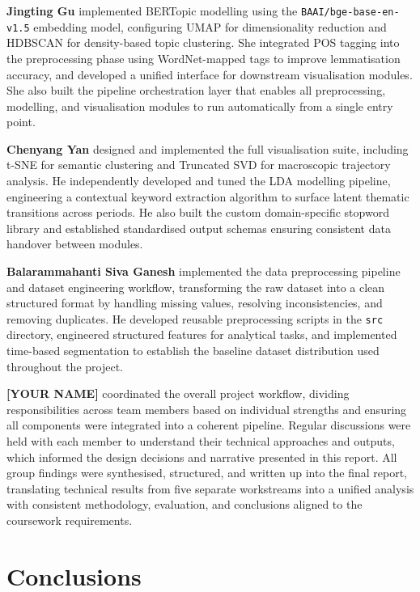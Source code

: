 \documentclass{article}
\begin{document}
\textbf{Jingting Gu} implemented BERTopic modelling using
the \texttt{BAAI/bge-base-en-v1.5} embedding model,
configuring UMAP for dimensionality reduction and HDBSCAN
for density-based topic clustering. She integrated POS
tagging into the preprocessing phase using WordNet-mapped
tags to improve lemmatisation accuracy, and developed a
unified interface for downstream visualisation modules.
She also built the pipeline orchestration layer that
enables all preprocessing, modelling, and visualisation
modules to run automatically from a single entry point.

\textbf{Chenyang Yan} designed and implemented the full
visualisation suite, including t-SNE for semantic
clustering and Truncated SVD for macroscopic trajectory
analysis. He independently developed and tuned the LDA
modelling pipeline, engineering a contextual keyword
extraction algorithm to surface latent thematic
transitions across periods. He also built the custom
domain-specific stopword library and established
standardised output schemas ensuring consistent data
handover between modules.

\textbf{Balarammahanti Siva Ganesh} implemented the
data preprocessing pipeline and dataset engineering
workflow, transforming the raw dataset into a clean
structured format by handling missing values, resolving
inconsistencies, and removing duplicates. He developed
reusable preprocessing scripts in the \texttt{src}
directory, engineered structured features for analytical
tasks, and implemented time-based segmentation to
establish the baseline dataset distribution used
throughout the project.

\textbf{[YOUR NAME]} coordinated the overall project
workflow, dividing responsibilities across team members
based on individual strengths and ensuring all components
were integrated into a coherent pipeline. Regular
discussions were held with each member to understand
their technical approaches and outputs, which informed
the design decisions and narrative presented in this
report. All group findings were synthesised, structured,
and written up into the final report, translating
technical results from five separate workstreams into
a unified analysis with consistent methodology,
evaluation, and conclusions aligned to the coursework
requirements.


\section{Conclusions}
\label{sec:conclusions}
\end{document}
